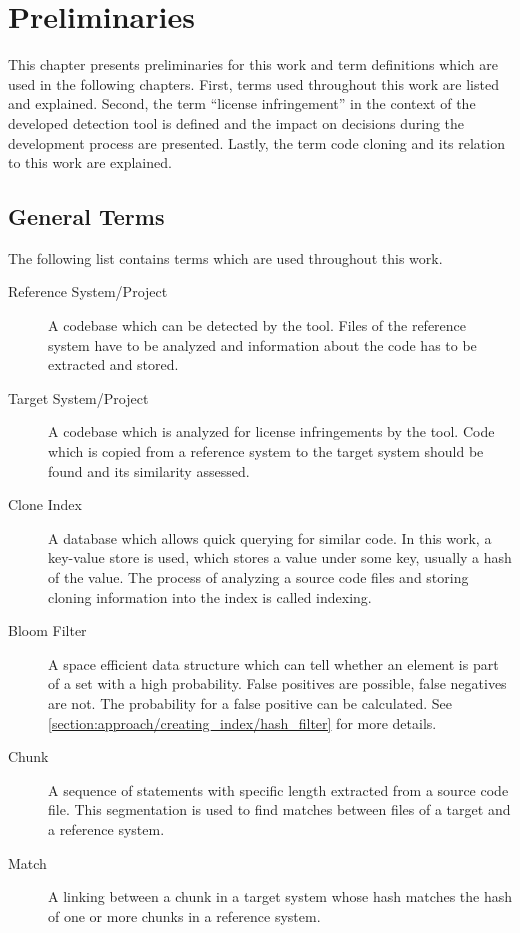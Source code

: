 
\chapter{Preliminaries}\label{chapter:preliminaries}
This chapter presents preliminaries for this work and term definitions which are used in the following chapters.
First, terms used throughout this work are listed and explained.
Second, the term \enquote{license infringement} in the context of the developed detection tool is defined and the impact on decisions during the development process are presented.
Lastly, the term code cloning and its relation to this work are explained.

\section{General Terms}\label{section:preliminaries/terms}
The following list contains terms which are used throughout this work.

\begin{description}
	\item[Reference System/Project]
		A codebase which can be detected by the tool. 
		Files of the reference system have to be analyzed and information about the code has to be extracted and stored.
	\item[Target System/Project]
		A codebase which is analyzed for license infringements by the tool.
		Code which is copied from a reference system to the target system should be found and its similarity assessed.
	\item[Clone Index] 
		A database which allows quick querying for similar code.
		In this work, a key-value store is used, which stores a value under some key, usually a hash of the value.
		The process of analyzing a source code files and storing cloning information into the index is called indexing.
	\item [Bloom Filter]
		A space efficient data structure which can tell whether an element is part of a set with a high probability. 
		False positives are possible, false negatives are not.
		The probability for a false positive can be calculated. 
		See \autoref{section:approach/creating_index/hash_filter} for more details.
	\item [Chunk]
		A sequence of statements with specific length extracted from a source code file.
		This segmentation is used to find matches between files of a target and a reference system.
	\item [Match]
		A linking between a chunk in a target system whose hash matches the hash of one or more chunks in a reference system.
\end{description}

